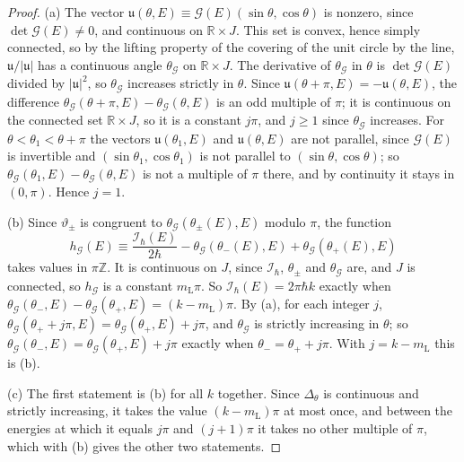 \documentclass[aps,prd,onecolumn,tightenlines,nofootinbib,notitlepage,11pt,floatfix]{revtex4-2}
\theoremstyle{indentedtheorem}
\begin{document}
\begin{proof}
(a) The vector $\mathfrak{u}(\theta,E)\equiv\mathcal{G}(E)(\sin\theta,\cos\theta)$ is nonzero, since $\det\mathcal{G}(E)\neq0$, and continuous on $\mathbb{R}\times J$. This set is convex, hence simply connected, so by the lifting property of the covering of the unit circle by the line, $\mathfrak{u}/|\mathfrak{u}|$ has a continuous angle $\theta_\mathcal{G}$ on $\mathbb{R}\times J$. The derivative of $\theta_\mathcal{G}$ in $\theta$ is $\det\mathcal{G}(E)$ divided by $|\mathfrak{u}|^2$, so $\theta_\mathcal{G}$ increases strictly in $\theta$. Since $\mathfrak{u}(\theta+\pi,E)=-\mathfrak{u}(\theta,E)$, the difference $\theta_\mathcal{G}(\theta+\pi,E)-\theta_\mathcal{G}(\theta,E)$ is an odd multiple of $\pi$; it is continuous on the connected set $\mathbb{R}\times J$, so it is a constant $j\pi$, and $j\geq1$ since $\theta_\mathcal{G}$ increases. For $\theta<\theta_1<\theta+\pi$ the vectors $\mathfrak{u}(\theta_1,E)$ and $\mathfrak{u}(\theta,E)$ are not parallel, since $\mathcal{G}(E)$ is invertible and $(\sin\theta_1,\cos\theta_1)$ is not parallel to $(\sin\theta,\cos\theta)$; so $\theta_\mathcal{G}(\theta_1,E)-\theta_\mathcal{G}(\theta,E)$ is not a multiple of $\pi$ there, and by continuity it stays in $(0,\pi)$. Hence $j=1$.

(b) Since $\vartheta_\pm$ is congruent to $\theta_\mathcal{G}(\theta_\pm(E),E)$ modulo $\pi$, the function
\begin{equation*}
    h_\mathcal{G}(E) \equiv \frac{\mathcal{I}_\hbar(E)}{2\hbar}-\theta_\mathcal{G}(\theta_-(E),E)+\theta_\mathcal{G}(\theta_+(E),E)
\end{equation*}
takes values in $\pi\mathbb{Z}$. It is continuous on $J$, since $\mathcal{I}_\hbar$, $\theta_\pm$ and $\theta_\mathcal{G}$ are, and $J$ is connected, so $h_\mathcal{G}$ is a constant $m_\text{L}\pi$. So $\mathcal{I}_\hbar(E)=2\pi\hbar k$ exactly when $\theta_\mathcal{G}(\theta_-,E)-\theta_\mathcal{G}(\theta_+,E)=(k-m_\text{L})\pi$. By (a), for each integer $j$, $\theta_\mathcal{G}(\theta_++j\pi,E)=\theta_\mathcal{G}(\theta_+,E)+j\pi$, and $\theta_\mathcal{G}$ is strictly increasing in $\theta$; so $\theta_\mathcal{G}(\theta_-,E)=\theta_\mathcal{G}(\theta_+,E)+j\pi$ exactly when $\theta_-=\theta_++j\pi$. With $j=k-m_\text{L}$ this is (b).

(c) The first statement is (b) for all $k$ together. Since $\Delta_\theta$ is continuous and strictly increasing, it takes the value $(k-m_\text{L})\pi$ at most once, and between the energies at which it equals $j\pi$ and $(j+1)\pi$ it takes no other multiple of $\pi$, which with (b) gives the other two statements.
\end{proof}
\end{document}
